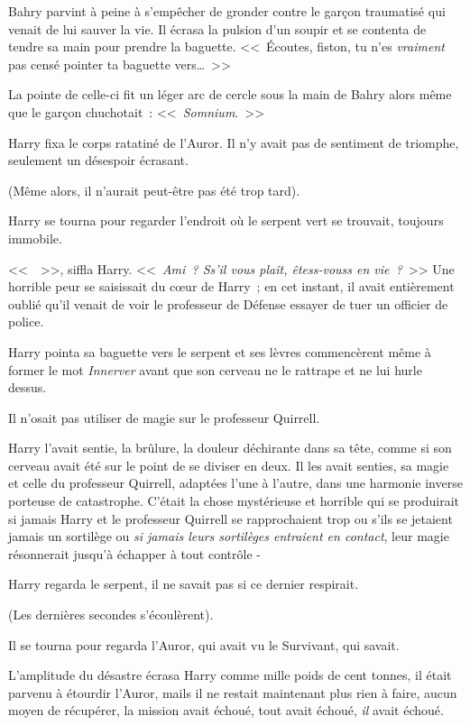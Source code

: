 Bahry parvint à peine à s'empêcher de gronder contre le garçon traumatisé qui venait de lui sauver la vie. Il écrasa la pulsion d'un soupir et se contenta de tendre sa main pour prendre la baguette. <<~Écoutes, fiston, tu n'es \emph{vraiment} pas censé pointer ta baguette vers…~>>

La pointe de celle-ci fit un léger arc de cercle sous la main de Bahry alors même que le garçon chuchotait~: <<~\emph{Somnium}.~>>

\later

Harry fixa le corps ratatiné de l'Auror. Il n'y avait pas de sentiment de triomphe, seulement un désespoir écrasant.

(Même alors, il n'aurait peut-être pas été trop tard).

Harry se tourna pour regarder l'endroit où le serpent vert se trouvait, toujours immobile.

<<~~>>, siffla Harry. <<~\emph{Ami~? Ss'il vous plaît, êtess-vouss en vie~?}~>> Une horrible peur se saisissait du cœur de Harry~; en cet instant, il avait entièrement oublié qu'il venait de voir le professeur de Défense essayer de tuer un officier de police.

Harry pointa sa baguette vers le serpent et ses lèvres commencèrent même à former le mot \emph{Innerver} avant que son cerveau ne le rattrape et ne lui hurle dessus.

Il n'osait pas utiliser de magie sur le professeur Quirrell.

Harry l'avait sentie, la brûlure, la douleur déchirante dans sa tête, comme si son cerveau avait été sur le point de se diviser en deux. Il les avait senties, sa magie et celle du professeur Quirrell, adaptées l'une à l'autre, dans une harmonie inverse porteuse de catastrophe. C'était la chose mystérieuse et horrible qui se produirait si jamais Harry et le professeur Quirrell se rapprochaient trop ou s'ils se jetaient jamais un sortilège ou \emph{si jamais leurs sortilèges entraient en contact}, leur magie résonnerait jusqu'à échapper à tout contrôle -

Harry regarda le serpent, il ne savait pas si ce dernier respirait.

(Les dernières secondes s'écoulèrent).

Il se tourna pour regarda l'Auror, qui avait vu le Survivant, qui savait.

L'amplitude du désastre écrasa Harry comme mille poids de cent tonnes, il était parvenu à étourdir l'Auror, mails il ne restait maintenant plus rien à faire, aucun moyen de récupérer, la mission avait échoué, tout avait échoué, \emph{il} avait échoué.

